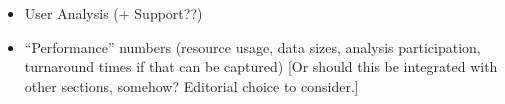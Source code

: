\documentclass [draft,notitlepage] {article}
\begin{document}
\begin{itemize}

\item User Analysis (+ Support??)






\item ``Performance'' numbers (resource usage, data sizes, analysis participation, turnaround times if that can be captured) [Or should this be integrated with other sections, somehow?  Editorial choice to consider.]



\end{itemize}
\end{document}
